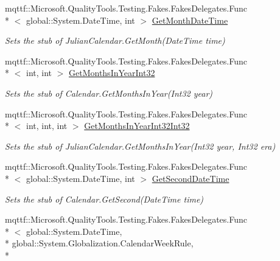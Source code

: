 \begin{DoxyCompactItemize}
mqttf\-::\-Microsoft.\-Quality\-Tools.\-Testing.\-Fakes.\-Fakes\-Delegates.\-Func\\*
$<$ global\-::\-System.\-Date\-Time, int $>$ \hyperlink{class_system_1_1_globalization_1_1_fakes_1_1_stub_julian_calendar_ada60b3c5d75096d447c4aeb4396ec253}{Get\-Month\-Date\-Time}
\begin{DoxyCompactList}\small\item\em Sets the stub of Julian\-Calendar.\-Get\-Month(\-Date\-Time time)\end{DoxyCompactList}\item 
mqttf\-::\-Microsoft.\-Quality\-Tools.\-Testing.\-Fakes.\-Fakes\-Delegates.\-Func\\*
$<$ int, int $>$ \hyperlink{class_system_1_1_globalization_1_1_fakes_1_1_stub_julian_calendar_a665405e89109c07cfc2a519e0c9c8558}{Get\-Months\-In\-Year\-Int32}
\begin{DoxyCompactList}\small\item\em Sets the stub of Calendar.\-Get\-Months\-In\-Year(\-Int32 year)\end{DoxyCompactList}\item 
mqttf\-::\-Microsoft.\-Quality\-Tools.\-Testing.\-Fakes.\-Fakes\-Delegates.\-Func\\*
$<$ int, int, int $>$ \hyperlink{class_system_1_1_globalization_1_1_fakes_1_1_stub_julian_calendar_a7c6297c1fe530398bbebff59c48616b9}{Get\-Months\-In\-Year\-Int32\-Int32}
\begin{DoxyCompactList}\small\item\em Sets the stub of Julian\-Calendar.\-Get\-Months\-In\-Year(\-Int32 year, Int32 era)\end{DoxyCompactList}\item 
mqttf\-::\-Microsoft.\-Quality\-Tools.\-Testing.\-Fakes.\-Fakes\-Delegates.\-Func\\*
$<$ global\-::\-System.\-Date\-Time, int $>$ \hyperlink{class_system_1_1_globalization_1_1_fakes_1_1_stub_julian_calendar_a950724e57a0562c3e4818f4822f2bde7}{Get\-Second\-Date\-Time}
\begin{DoxyCompactList}\small\item\em Sets the stub of Calendar.\-Get\-Second(\-Date\-Time time)\end{DoxyCompactList}\item 
mqttf\-::\-Microsoft.\-Quality\-Tools.\-Testing.\-Fakes.\-Fakes\-Delegates.\-Func\\*
$<$ global\-::\-System.\-Date\-Time, \\*
global\-::\-System.\-Globalization.\-Calendar\-Week\-Rule, \\*

\end{DoxyCompactItemize}

